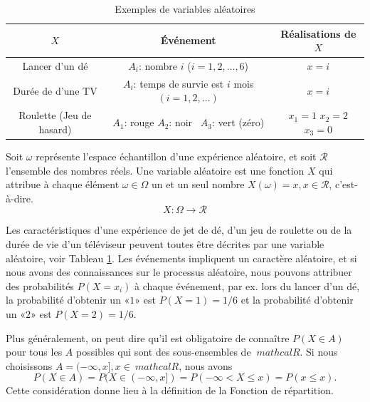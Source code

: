 \begin{table}[h!]
    \centering
    \caption{Exemples de variables aléatoires}
    \begin{tabular}{||c | c | c ||}
        \hline
        $X$ & Événement  & Réalisations de $X$\\ [0.5ex]
        \hline\hline
        Lancer d'un dé & $A_i$: nombre $i$ ($i = 1, 2,\dots, 6$) & $x = i$ \\\hline
        Durée de d'une TV & $A_i$: temps de survie est $i$ mois $(i = 1, 2, \dots)$ & $x = i$  \\\hline
        Roulette (Jeu de hasard) &\makecell{  $A_1$: rouge\\ $A_2$: noir\\\ $A_3$: vert (zéro)} &\makecell{ $x_1=1$\\$x_2=2$\\ $x_3=0$} \\ [1ex]
        \hline
    \end{tabular}

    \label{table:1}
\end{table}

\theoremstyle{definition}
\begin{definition}{}
Soit $\omega$ représente l'espace échantillon d'une expérience aléatoire, et soit $\mathcal{R}$ l'ensemble des nombres
réels. Une variable aléatoire est une fonction $X$ qui attribue à chaque élément $\omega \in \Omega$ un et un seul
nombre $X (\omega) = x, x \in \mathcal{R}$, c'est-à-dire.
\begin{equation}
    X : \Omega \to \mathcal{R}
\end{equation}
\end{definition}

\begin{example}
    Les caractéristiques d'une expérience de jet de dé, d'un jeu de roulette ou de la durée de vie d'un téléviseur
    peuvent toutes être décrites par une variable aléatoire, voir Tableau \ref{table:1}. Les événements impliquent un
    caractère aléatoire, et si nous avons des connaissances sur le processus aléatoire, nous pouvons attribuer des
    probabilités $P (X = x_i)$ à chaque événement, par ex. lors du lancer d'un dé, la probabilité d'obtenir
    un «$1$» est $P (X = 1) = 1/6$ et la probabilité d'obtenir un «$2$» est $P (X = 2) = 1/6$.
\end{example}
Plus généralement, on peut dire qu'il est obligatoire de connaître $ P (X \in A) $ pour tous les $ A $ possibles qui sont
des sous-ensembles de $ \ mathcal {R} $. Si nous choisissons $ A = (-\infty, x], x ∈ \ mathcal {R} $, nous avons
$$ P(X\in A) = P(X\in (-\infty,x])=P(-\infty<X\leq x)=P(x\leq x). $$
Cette considération donne lieu à la définition de la Fonction de répartition.

